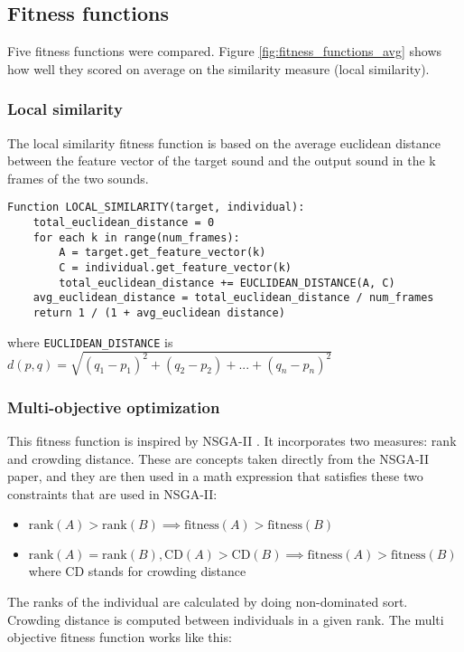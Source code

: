 \subsection{Fitness functions}
Five fitness functions were compared. Figure \ref{fig:fitness_functions_avg} shows how well they scored on average on the similarity measure (local similarity).

\subsubsection{Local similarity}
The local similarity fitness function is based on the average euclidean distance between the feature vector of the target sound and the output sound in the k frames of the two sounds.

\begin{verbatim}
Function LOCAL_SIMILARITY(target, individual):
    total_euclidean_distance = 0
    for each k in range(num_frames):
        A = target.get_feature_vector(k)
        C = individual.get_feature_vector(k)
        total_euclidean_distance += EUCLIDEAN_DISTANCE(A, C)
    avg_euclidean_distance = total_euclidean_distance / num_frames
    return 1 / (1 + avg_euclidean distance)
\end{verbatim}

where \texttt{EUCLIDEAN\_DISTANCE} is $d(p,q)=\sqrt{(q_1-p_1)^2+(q_2-p_2)+...+(q_n-p_n)^2}$

\subsubsection{Multi-objective optimization}
This fitness function is inspired by NSGA-II \citep{nsga2}. It incorporates two measures: rank and crowding distance. These are concepts taken directly from the NSGA-II paper, and they are then used in a math expression that satisfies these two constraints that are used in NSGA-II:

\begin{itemize}
\item $\text{rank}(A) > \text{rank}(B) \implies \text{fitness}(A) > \text{fitness}(B)$
\item $\text{rank}(A) = \text{rank}(B), \text{CD}(A) > \text{CD}(B) \implies \text{fitness}(A) > \text{fitness}(B)$
\\ where CD stands for crowding distance
\end{itemize}

The ranks of the individual are calculated by doing non-dominated sort. Crowding distance is computed between individuals in a given rank. The multi objective fitness function works like this:

